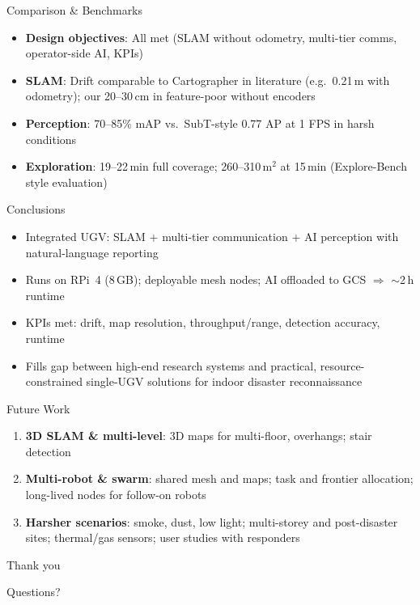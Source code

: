 \documentclass[aspectratio=169]{beamer}
\begin{document}
\begin{frame}{Comparison \& Benchmarks}
\begin{itemize}
\item \textbf{Design objectives}: All met (SLAM without odometry, multi-tier comms, operator-side AI, KPIs)
\item \textbf{SLAM}: Drift comparable to Cartographer in literature (e.g.\ 0.21\,m with odometry); our 20--30\,cm in feature-poor without encoders
\item \textbf{Perception}: 70--85\% mAP vs.\ SubT-style 0.77 AP at 1 FPS in harsh conditions
\item \textbf{Exploration}: 19--22\,min full coverage; 260--310\,m$^2$ at 15\,min (Explore-Bench style evaluation)
\end{itemize}
\end{frame}

\begin{frame}{Conclusions}
\begin{itemize}
\item Integrated UGV: SLAM + multi-tier communication + AI perception with natural-language reporting
\item Runs on RPi~4 (8\,GB); deployable mesh nodes; AI offloaded to GCS $\Rightarrow$ $\sim$2\,h runtime
\item KPIs met: drift, map resolution, throughput/range, detection accuracy, runtime
\item Fills gap between high-end research systems and practical, resource-constrained single-UGV solutions for indoor disaster reconnaissance
\end{itemize}
\end{frame}

\begin{frame}{Future Work}
\begin{enumerate}
\item \textbf{3D SLAM \& multi-level}: 3D maps for multi-floor, overhangs; stair detection
\item \textbf{Multi-robot \& swarm}: shared mesh and maps; task and frontier allocation; long-lived nodes for follow-on robots
\item \textbf{Harsher scenarios}: smoke, dust, low light; multi-storey and post-disaster sites; thermal/gas sensors; user studies with responders
\end{enumerate}
\end{frame}

\begin{frame}{Thank you}
\begin{center}
\Large Questions?
\end{center}
\end{frame}
\end{document}
